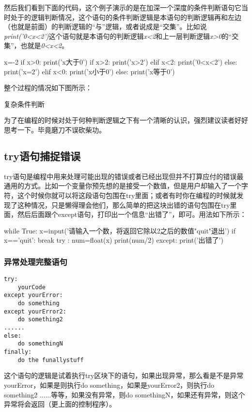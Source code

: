 \documentclass[12pt,oneside]{book}
\begin{document}
\begin{common-format}
然后我们看到下面的代码，这个例子演示的是在加深一个深度的条件判断语句它当时处于的逻辑判断情况，这个语句的条件判断逻辑是本语句的判断逻辑再和左边（也就是前面）的判断逻辑的“与”逻辑，或者说成是“交集”。比如说\textit{print('0<x<2')}这个语句就是本语句的判断逻辑\textit{x<2}和上一层判断逻辑\textit{x>0}的“交集”，也就是\textit{0<x<2}。

\begin{tcbpython}
x=-2
if x>0:
    print('x大于0')
    if x>2:
        print('x>2')
    elif x<2:
        print('0<x<2')
    else:
        print('x=2')
elif x<0:
    print('x小于0')
else:
    print('x等于0')
\end{tcbpython}


整个过程的情况如下图所示：
\begin{linefig}{复杂条件判断}
\caption{复杂条件判断}
\label{fig:复杂条件判断}
\end{linefig}
为了在编程的时候对处于何种判断逻辑之下有一个清晰的认识，强烈建议读者好好思考一下。毕竟磨刀不误砍柴功。


\subsection{try语句捕捉错误}
try语句是编程中用来处理可能出现的错误或者已经出现但并不打算应付的错误最通用的方式。比如一个变量你预先想的是接受一个数值，但是用户却输入了一个字符，这个时候你就可以将这段语句包围在try里面；或者有时你在编程的时候就发现了这种情况，只是懒得理会他们，那么简单的把这块出错的语句包围在try里面，然后后面跟个except语句，打印出一个信息“出错了”，即可。用法如下所示：
\begin{tcbpython}
while True:
    x=input('请输入一个数，将返回它除以2之后的数值"quit"退出\n')
    if x=='quit':
        break
    try :
        num=float(x)
        print(num/2)
    except:
        print('出错了')
\end{tcbpython}

\subsubsection{异常处理完整语句}
\begin{Verbatim}
try:
    yourCode
except yourError:
    do something
except yourError2:
    do something2
......
else:
    do somethingN
finally:
    do the funallystuff
\end{Verbatim}

这个语句的逻辑是试着执行try区块下的语句，如果出现异常，那么看是不是异常yourError，如果是则执行do something，如果是yourError2，则执行do something2 ......等等，如果没有异常，则do somethingN，如果还有异常，则这个异常将会返回（更上面的控制程序）。


\end{common-format}
\end{document}
